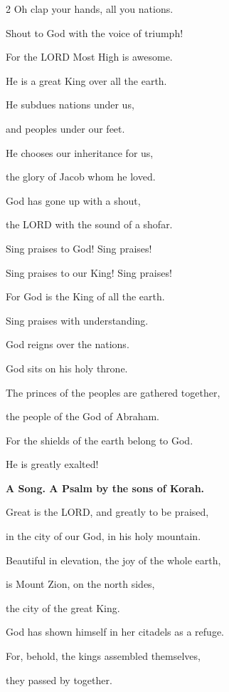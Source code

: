 \begin{multicols}{2}
	\myverse*{}Oh clap your hands, all you nations.
	
	Shout to God with the voice of triumph!
	
	
	\myverse{}For the LORD Most High is awesome.
	
	He is a great King over all the earth.
	
	
	\myverse{}He subdues nations under us,
	
	and peoples under our feet.
	
	
	\myverse{}He chooses our inheritance for us,
	
	the glory of Jacob whom he loved.
	
	\vspace{\baselineskip}
	
	
	\myverse{}God has gone up with a shout,
	
	the LORD with the sound of a shofar.
	
	
	\myverse{}Sing praises to God! Sing praises!
	
	Sing praises to our King! Sing praises!
	
	
	\myverse{}For God is the King of all the earth.
	
	Sing praises with understanding.
	
	
	\myverse{}God reigns over the nations.
	
	God sits on his holy throne.
	
	
	\myverse{}The princes of the peoples are gathered together,
	
	the people of the God of Abraham.
	
	For the shields of the earth belong to God.
	
	He is greatly exalted!
	
	
	\mychapter{}\textbf{A Song. A Psalm by the sons of Korah.}
	
	\quad \myverse*{}Great is the LORD, and greatly to be praised,
	
	in the city of our God, in his holy mountain.
	
	
	\myverse{}Beautiful in elevation, the joy of the whole earth,
	
	is Mount Zion, on the north sides,
	
	the city of the great King.
	
	
	\myverse{}God has shown himself in her citadels as a refuge.
	
	
	\myverse{}For, behold, the kings assembled themselves,
	
	they passed by together.
	

\end{multicols}
